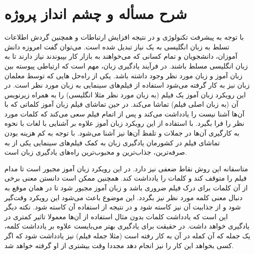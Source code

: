 \section{شرح مسأله و چشم انداز پروژه}
با توجه به پیشرفت تکنولوژی و در نتیجه افزایش ارتباطات  و همچنین گردش  اطلاعات تسلط به زبان انگلیسی به یک نیاز تبدیل شده است.  می‌توان گفت امروزه دانش آموزان، دانشجویان و تمام کسانی که می‌خواهند به بازار کار بپیوندند نیاز دارند تا به زبان انگلیسی مسلط باشند. در فرآیند یادگیری زبان، مهم است که ارتباطی پیوسته بین زبان آموز و زبان مورد نظر وجود داشته باشد. یکی از راه‌حل هایی که توسط معلمان زبان نیز به کار گرفته می‌شود استفاده از فیلم‌های سینمایی به زبان مورد نظر  است. در این رویکرد زبان آموز یک فیلم (به زبان مورد نظر مثلا انگلیسی) را به همراه زیرنویس آن (به زبان اصلی فیلم) تماشا می‌کند. در حین تماشای فیلم زبان آموز کلماتی که با آن‌ها آشنا نیست را یادداشت می‌کند و پس از اتمام فیلم سعی می‌کند که کلمات مورد نظر را فرا بگیرد. با استفاده از این رویکرد زبان آموز علاوه بر آشنایی با لغات با نحوه به کارگیری آن‌ها در جملات و تلفظ آن‌ها نیز آشنا می‌شود. 
 با توجه به کم هزینه بودن تماشای فیلم در کشورمان یادگیری زبان به کمک فیلم‌های سینمایی یکی از به صرفه‌ترین، جذاب‌ترین و محبوب‌ترین راه‌های یادگیری زبان است.
 
 متاسفانه این روش نقاط ضعفی نیز دارد. در این رویکرد  زبان آموز مجبور است تا مدام فیلم را متوقف کند و کلمات را یادداشت کند. همچنین ممکن است دانستن معنی برخی از آن کلمات برای درک فیلم ضروری باشد و زبان آموز مجبور شود تا در همان موقع به دنبال معنی کلمه مورد نظر نیز بگردد.  این موضوع باعث می‌شود این رویکرد وقت‌‌گیر شود و از جذابیت آن نیز کاسته شود و در نتیجه از استفاده آن کاسته شود. نکته دیگر این است که یادداشت کلمات بدون مثال استفاده از آن‌ها معمولا تاثیر کمتری  در یادگیری خواهد داشت. در حقیقت برای یادگیری بهتر می‌بایست علاوه بر یادداشت کلمه، یک جمله که آن کمله در آن به کار رفته است (مثلا جمله فیلم) نیز یادداشت شود که اگر کسی بخواهد این کار را نیز انجام دهد مجددا وقت بیشتری از او گرفته خواهد شد.
 

